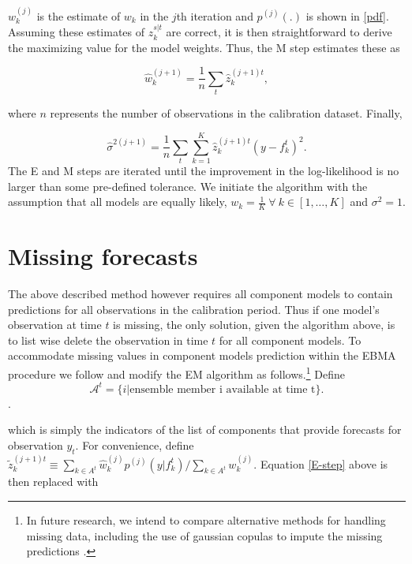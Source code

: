 \documentclass[12pt,fullpage,endnotes]{article}
\begin{document}
$w_k^{(j)}$ is the estimate of $w_k$ in the $j$th iteration and
$p^{(j)}(.)$ is shown in \eqref{pdf}.  Assuming these estimates of
$z_{k}^{s|t}$ are correct, it is then straightforward to derive the
maximizing value for the model weights. Thus, the M step estimates
these as 

\begin{equation}
\label{M-step}
\hat{w}^{(j+1)}_k=\frac{1}{n}\underset{t}{\sum}\hat{z}^{(j+1)t}_{k},
\end{equation}

\noindent where $n$ represents the number of observations in the
calibration dataset.  Finally, %

\begin{equation}
\label{sigma}
\hat{\sigma}^{2(j+1)}=\frac{1}{n}\underset{t}{\sum}\overset{K}{\underset{k=1}{\sum}}\hat{z}^{(j+1)t}_{k}(y-f_{k}^{t})^2.
\end{equation}
\noindent The E and M steps are iterated until the improvement in the
log-likelihood is no larger than some pre-defined tolerance.  We
initiate the algorithm with the assumption that all models are equally
likely, $w_k = \frac{1}{K} ~ \forall ~ k \in [1, \ldots, K]$ and
$\sigma^2=1$.


\section{Missing forecasts}
\label{missing}
The above described method however requires all component models to contain predictions for all observations in the calibration period. Thus if one model's observation at time $t$ is missing, the only solution, given the algorithm above, is to list wise delete the observation in time $t$ for all component models. To accommodate missing values in component models prediction within the EBMA procedure we follow \citet{Fraley:2010} and modify the EM algorithm as follows.\footnote{In future research, we intend to compare alternative methods for handling missing data, including the use of gaussian copulas to impute the missing predictions \citep{Hoff:2007}.}  Define $$\mathcal{A}^t = \{i|\mbox{ensemble member i available at time t}\}.$$.

\noindent which is simply the indicators of the list of components that provide forecasts for observation $y_t$.   For convenience, define $\tilde{z}_k^{(j+1)t} \equiv {{\underset{k \in A^t}{\sum}}\hat{w}^{(j)}_kp^{(j)}(y|f_{k}^{t})}/{\underset{k \in A^t}\sum w_k^{(j)}}$.  Equation \ref{E-step} above is then replaced with
\end{document}
